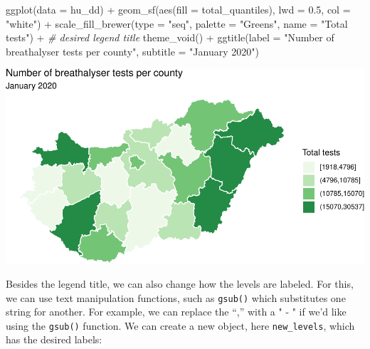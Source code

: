 \documentclass[
]{book}
\makeatletter
\newenvironment{Shaded}{\begin{snugshade}}{\end{snugshade}}
\newcommand{\AttributeTok}[1]{\textcolor[rgb]{0.61,0.61,0.61}{#1}}
\newcommand{\CommentTok}[1]{\textcolor[rgb]{0.37,0.37,0.37}{\textit{#1}}}
\newcommand{\FloatTok}[1]{\textcolor[rgb]{0.06,0.06,0.06}{#1}}
\newcommand{\FunctionTok}[1]{\textcolor[rgb]{0,0,0}{#1}}
\newcommand{\NormalTok}[1]{#1}
\newcommand{\OtherTok}[1]{\textcolor[rgb]{0.37,0.37,0.37}{#1}}
\newcommand{\SpecialCharTok}[1]{\textcolor[rgb]{0,0,0}{#1}}
\newcommand{\StringTok}[1]{\textcolor[rgb]{0.5,0.5,0.5}{#1}}
\newenvironment{kframe}{%
\medskip{}
\setlength{\fboxsep}{.8em}
 \def\at@end@of@kframe{}%
 \ifinner\ifhmode%
  \def\at@end@of@kframe{\end{minipage}}%
  \begin{minipage}{\columnwidth}%
 \fi\fi%
 \def\FrameCommand##1{\hskip\@totalleftmargin \hskip-\fboxsep
 \colorbox{shadecolor}{##1}\hskip-\fboxsep
     \hskip-\linewidth \hskip-\@totalleftmargin \hskip\columnwidth}%
 \MakeFramed {\advance\hsize-\width
   \@totalleftmargin\z@ \linewidth\hsize
   \@setminipage}}%
 {\par\unskip\endMakeFramed%
 \at@end@of@kframe}
\renewenvironment{Shaded}{\begin{kframe}}{\end{kframe}}
\makeatother
\begin{document}
\begin{Shaded}
\begin{Highlighting}[]
\FunctionTok{ggplot}\NormalTok{(}\AttributeTok{data =}\NormalTok{ hu\_dd) }\SpecialCharTok{+} 
  \FunctionTok{geom\_sf}\NormalTok{(}\FunctionTok{aes}\NormalTok{(}\AttributeTok{fill =}\NormalTok{ total\_quantiles), }
          \AttributeTok{lwd =} \FloatTok{0.5}\NormalTok{, }\AttributeTok{col =} \StringTok{"white"}\NormalTok{) }\SpecialCharTok{+} 
  \FunctionTok{scale\_fill\_brewer}\NormalTok{(}\AttributeTok{type =} \StringTok{"seq"}\NormalTok{, }\AttributeTok{palette =} \StringTok{"Greens"}\NormalTok{, }
                    \AttributeTok{name =} \StringTok{"Total tests"}\NormalTok{) }\SpecialCharTok{+} \CommentTok{\# desired legend title}
  \FunctionTok{theme\_void}\NormalTok{() }\SpecialCharTok{+} 
  \FunctionTok{ggtitle}\NormalTok{(}\AttributeTok{label =} \StringTok{"Number of breathalyser tests per county"}\NormalTok{, }
          \AttributeTok{subtitle =} \StringTok{"January 2020"}\NormalTok{)}
\end{Highlighting}
\end{Shaded}

\includegraphics{crime_mapping_files/figure-latex/legend-1.pdf}

Besides the legend title, we can also change how the levels are labeled. For this, we can use text manipulation functions, such as \texttt{gsub()} which substitutes one string for another. For example, we can replace the ``,'' with a " - " if we'd like using the \texttt{gsub()} function. We can create a new object, here \texttt{new\_levels}, which has the desired labels:

\begin{Shaded}
\end{Shaded}
\end{document}
